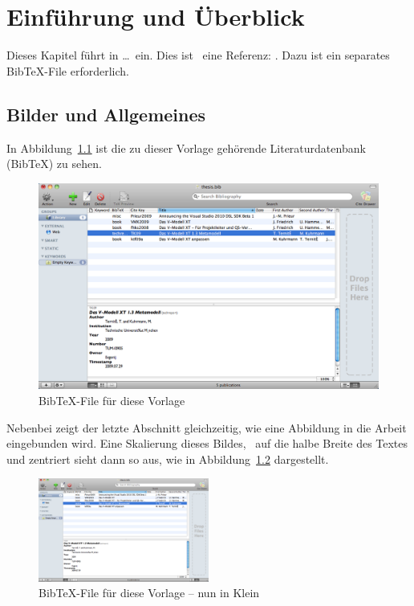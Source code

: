 \chapter{Einf\"uhrung und \"Uberblick}
\label{chp:Intro}
Dieses Kapitel f\"uhrt in \ldots\ ein. Dies ist \zB\ eine Referenz: \cite{Prieur2009}. Dazu ist ein separates BibTeX-File erforderlich.

\section{Bilder und Allgemeines}
\label{sec:1:BilderUndSo}
In Abbildung~\ref{fig:bibtex} ist die zu dieser Vorlage geh\"orende Literaturdatenbank (BibTeX) zu sehen.

\begin{figure}[htbp]
	\includegraphics[width=1.00\textwidth]{imgs/bibtex.png}
	\caption{BibTeX-File f\"ur diese Vorlage}
	\label{fig:bibtex}
\end{figure}

Nebenbei zeigt der letzte Abschnitt gleichzeitig, wie eine Abbildung in die Arbeit eingebunden wird. Eine Skalierung dieses Bildes, \zB\ auf die halbe Breite des Textes und zentriert sieht dann so aus, wie in Abbildung~\ref{fig:bibtex2} dargestellt.

\begin{figure}[htbp]
	\centering
	\includegraphics[width=0.5\textwidth]{imgs/bibtex.png}
	\caption[Alternativtext]{BibTeX-File f\"ur diese Vorlage -- nun in Klein}
	\label{fig:bibtex2}
\end{figure}

